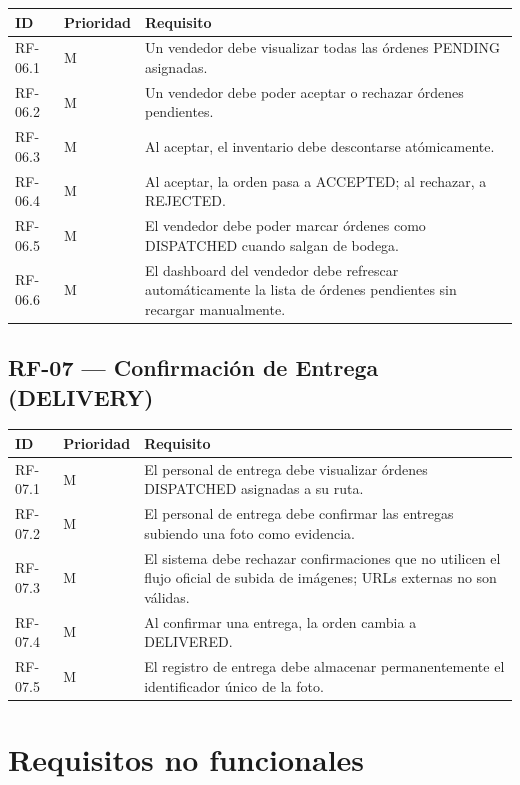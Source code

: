 \documentclass[12pt,a4paper]{report}
\begin{document}
\begin{longtable}{|p{2cm}|p{2cm}|p{10cm}|}
\hline
\textbf{ID} & \textbf{Prioridad} & \textbf{Requisito} \\ \hline
RF-06.1 & M & Un vendedor debe visualizar todas las órdenes PENDING asignadas. \\ \hline
RF-06.2 & M & Un vendedor debe poder aceptar o rechazar órdenes pendientes. \\ \hline
RF-06.3 & M & Al aceptar, el inventario debe descontarse atómicamente. \\ \hline
RF-06.4 & M & Al aceptar, la orden pasa a ACCEPTED; al rechazar, a REJECTED. \\ \hline
RF-06.5 & M & El vendedor debe poder marcar órdenes como DISPATCHED cuando salgan de bodega. \\ \hline
RF-06.6 & M & El dashboard del vendedor debe refrescar automáticamente la lista de órdenes pendientes sin recargar manualmente. \\ \hline
\end{longtable}

\subsection{RF-07 --- Confirmación de Entrega (DELIVERY)}

\begin{longtable}{|p{2cm}|p{2cm}|p{10cm}|}
\hline
\textbf{ID} & \textbf{Prioridad} & \textbf{Requisito} \\ \hline
RF-07.1 & M & El personal de entrega debe visualizar órdenes DISPATCHED asignadas a su ruta. \\ \hline
RF-07.2 & M & El personal de entrega debe confirmar las entregas subiendo una foto como evidencia. \\ \hline
RF-07.3 & M & El sistema debe rechazar confirmaciones que no utilicen el flujo oficial de subida de imágenes; URLs externas no son válidas. \\ \hline
RF-07.4 & M & Al confirmar una entrega, la orden cambia a DELIVERED. \\ \hline
RF-07.5 & M & El registro de entrega debe almacenar permanentemente el identificador único de la foto. \\ \hline
\end{longtable}

\section{Requisitos no funcionales}
\end{document}
